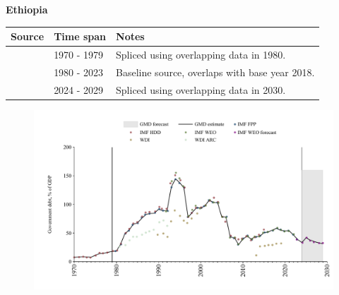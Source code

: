 \documentclass[12pt,a4paper,landscape]{article}
\begin{document}
\begin{adjustbox}{max totalsize={\paperwidth}{\paperheight},center}
\begin{minipage}[t][\textheight][t]{\textwidth}
\vspace*{0.5cm}
{}
\begin{center}
{\Large\bfseries Ethiopia}
\end{center}
\vspace{0.5cm}
\begin{table}[H]
\centering
\small
\begin{tabular}{|l|l|l|}
\hline
\textbf{Source} & \textbf{Time span} & \textbf{Notes} \\
\hline
\rowcolor{white}\cite{IMF_HDD}& 1970 - 1979 &Spliced using overlapping data in 1980.\\
\rowcolor{lightgray}\cite{IMF_FPP}& 1980 - 2023 &Baseline source, overlaps with base year 2018.\\
\rowcolor{white}\cite{IMF_WEO_forecast}& 2024 - 2029 &Spliced using overlapping data in 2030.\\
\hline
\end{tabular}
\end{table}
\begin{figure}[H]
\centering
\includegraphics[width=\textwidth,height=0.6\textheight,keepaspectratio]{graphs/ETH_govdebt_GDP.pdf}
\end{figure}
\end{minipage}
\end{adjustbox}
\end{document}
